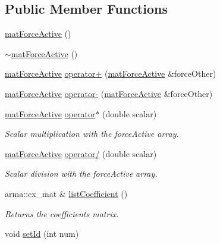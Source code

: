 \subsection*{Public Member Functions}
\begin{DoxyCompactItemize}
\item 
\hyperlink{classosea_1_1ofreq_1_1mat_force_active_addc507c90f98f3a9bb9bfe57897df3ca}{mat\-Force\-Active} ()
\item 
\hyperlink{classosea_1_1ofreq_1_1mat_force_active_aba1957829e2109f03c6fc03990258210}{$\sim$mat\-Force\-Active} ()
\item 
\hyperlink{classosea_1_1ofreq_1_1mat_force_active}{mat\-Force\-Active} \hyperlink{classosea_1_1ofreq_1_1mat_force_active_a8bc32fc773bd6c29d8bd7790194a10cf}{operator+} (\hyperlink{classosea_1_1ofreq_1_1mat_force_active}{mat\-Force\-Active} \&force\-Other)
\item 
\hyperlink{classosea_1_1ofreq_1_1mat_force_active}{mat\-Force\-Active} \hyperlink{classosea_1_1ofreq_1_1mat_force_active_a150bda87debf622dacb439e8e983fa3c}{operator-\/} (\hyperlink{classosea_1_1ofreq_1_1mat_force_active}{mat\-Force\-Active} \&force\-Other)
\item 
\hyperlink{classosea_1_1ofreq_1_1mat_force_active}{mat\-Force\-Active} \hyperlink{classosea_1_1ofreq_1_1mat_force_active_acdd9b4cf6b8c39a4bb973dd880939b3b}{operator$\ast$} (double scalar)
\begin{DoxyCompactList}\small\item\em Scalar multiplication with the force\-Active array. \end{DoxyCompactList}\item 
\hyperlink{classosea_1_1ofreq_1_1mat_force_active}{mat\-Force\-Active} \hyperlink{classosea_1_1ofreq_1_1mat_force_active_ae61e3aa510585e1faa12595aa345c2c5}{operator/} (double scalar)
\begin{DoxyCompactList}\small\item\em Scalar division with the force\-Active array. \end{DoxyCompactList}\item 
arma\-::cx\-\_\-mat \& \hyperlink{classosea_1_1ofreq_1_1mat_force_active_ab2cb4bbd11161f8c2944675815dea81c}{list\-Coefficient} ()
\begin{DoxyCompactList}\small\item\em Returns the coefficients matrix. \end{DoxyCompactList}\item 
void \hyperlink{classosea_1_1ofreq_1_1mat_force_active_a2784051c78388741bf1cf66d18df0b2c}{set\-Id} (int num)

\end{DoxyCompactItemize}
